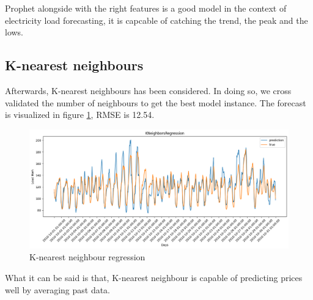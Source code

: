 
Prophet alongside with the right features is a good model in the context of electricity load forecasting, it is capcable of catching the trend, the peak and the lows. 

\subsection{K-nearest neighbours}
Afterwards, K-nearest neighbours has been considered. In doing so, we cross validated the number of neighbours to get the best model instance. The forecast is visualized in figure \ref{fig:knn_price}, RMSE is 12.54.
\begin{figure}[!h]
    \includegraphics[width=\textwidth]{images/knn_price.png}
    \caption{K-nearest neighbour regression}
    \label{fig:knn_price}
\end{figure}
What it can be said is that, K-nearest neighbour is capable of predicting prices well by averaging past data.

